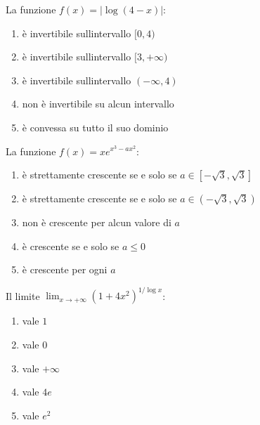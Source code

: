 \begin{quiz}
La funzione $f(x)=|\log(4-x)|$:
\begin{enumerate}
\item \`e invertibile sull\textquotesingle intervallo $[0,4)$
\item \`e invertibile sull\textquotesingle intervallo $[3,+\infty)$
\item \`e invertibile sull\textquotesingle intervallo $(-\infty,4)$
\item non \`e invertibile su alcun intervallo
\item \`e convessa su tutto il suo dominio
\end{enumerate}
\end{quiz}

\begin{quiz}
La funzione $f(x)=xe^{x^3-ax^2}$:
\begin{enumerate}
\item \`e strettamente crescente se e solo se $a\in[-\sqrt3,\sqrt3]$
\item \`e strettamente crescente se e solo se $a\in(-\sqrt3,\sqrt3)$
\item non \`e crescente per alcun valore di $a$
\item \`e crescente se e solo se $a\le0$
\item \`e crescente per ogni $a$
\end{enumerate}
\end{quiz}

\begin{quiz}
Il limite $\displaystyle\lim_{x\to+\infty}(1+4x^2)^{1/\log x}$:
\begin{enumerate}
\item vale $1$
\item vale $0$
\item vale $+\infty$
\item vale $4e$
\item vale $e^2$
\end{enumerate}
\end{quiz}

